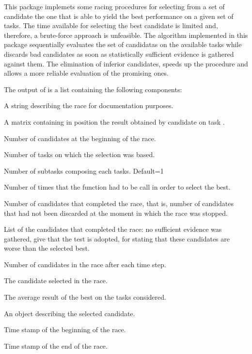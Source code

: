 \begin{Details}\relax
This package implemets some racing procedures for selecting
from a set of candidate the one that is able to yield the best
performance on a given set of tasks. The time available for selecting
the best candidate is limited and, therefore, a brute-force approach is
unfeasible.  The algorithm implemented in this package sequentially
evaluates the set of candidatas on the available tasks while discards
bad candidates as soon as statistically sufficient evidence is gathered
against them.  The elimination of inferior candidates, speeds up the
procedure and allows a more reliable evaluation of the promising ones.
\end{Details}
\begin{Value}
The output of  is a list containing the following
components:

\begin{ldescription}
\item[\code{precis}] A string describing the race for documentation
purposes.
\item[\code{results}] A matrix containing in position \code{[i,j]} the result
obtained by candidate  on task .
\item[\code{no.candidates}] Number of candidates at the beginning of the race.
\item[\code{no.tasks}] Number of tasks on which the selection was based.
\item[\code{no.subtasks}] Number of subtasks composing each tasks. Default=1
\item[\code{no.experiments}] Number of times that the function
 had to be call in order to select the best.
\item[\code{no.alive}] Number of candidates that completed the race, that is,
number of candidates that had not been discarded at the moment in
which the race was stopped.
\item[\code{alive}] List of the candidates that completed the race:
no sufficient evidence was gathered, give that the test
 is adopted, for stating that these candidates are
worse than the selected best.
\item[\code{alive.inTime}] Number of candidates in the race after each time
step.
\item[\code{best}] The candidate selected in the race.
\item[\code{mean.best}] The average result of the best on the tasks
considered.
\item[\code{description.best}] An object describing the selected candidate.
\item[\code{timestamp.start}] Time stamp of the beginning of the race.
\item[\code{timestamp.end}] Time stamp of the end of the race.
\end{ldescription}
\end{Value}
